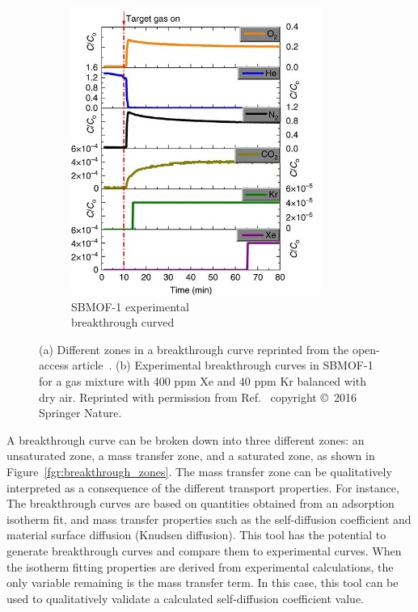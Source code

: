 \documentclass[main]{subfiles}
\begin{document}
\begin{figure}[ht]
\begin{subfigure}[b]{0.33\textwidth}
    \includegraphics[width=\textwidth]{figures/6-perspectives/sbmof_breakthrough.jpg}
    \caption{SBMOF-1 experimental \\breakthrough curved}\label{fgr:sbmof_breakthrough}
  \end{subfigure}
  \hspace{0.5cm}
  \caption{ (a) Different zones in a breakthrough curve reprinted from the open-access article~\cite{Sharma_2023}. (b) Experimental breakthrough curves in SBMOF-1 for a gas mixture with 400 ppm Xe and 40 ppm Kr balanced with dry air. Reprinted with permission from Ref.~\cite{Banerjee_2016} copyright \copyright\ 2016 Springer Nature. }\label{fgr:breakthrough}
\end{figure}

A breakthrough curve can be broken down into three different zones: an unsaturated zone, a mass transfer zone, and a saturated zone, as shown in Figure~\ref{fgr:breakthrough_zones}. The mass transfer zone can be qualitatively interpreted as a consequence of the different transport properties. For instance, The breakthrough curves are based on quantities obtained from an adsorption isotherm fit, and mass transfer properties such as the self-diffusion coefficient and material surface diffusion (Knudsen diffusion).\autocite{Sharma_2023} This tool has the potential to generate breakthrough curves and compare them to experimental curves. When the isotherm fitting properties are derived from experimental calculations, the only variable remaining is the mass transfer term. In this case, this tool can be used to qualitatively validate a calculated self-diffusion coefficient value.
\end{document}
